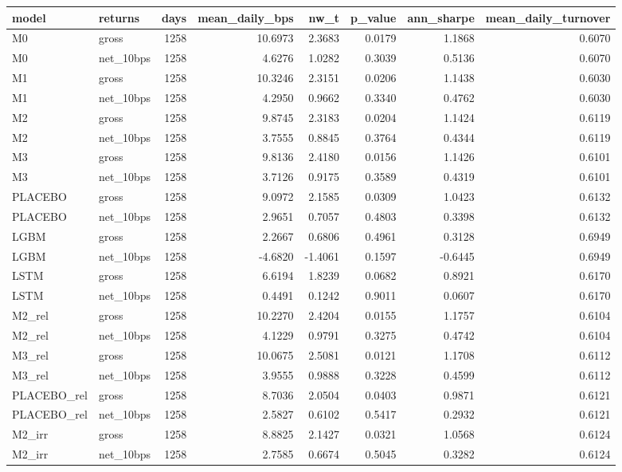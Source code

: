 \begin{tabular}{llrrrrrr}
\toprule
model & returns & days & mean\_daily\_bps & nw\_t & p\_value & ann\_sharpe & mean\_daily\_turnover \\
\midrule
M0 & gross & 1258 & 10.6973 & 2.3683 & 0.0179 & 1.1868 & 0.6070 \\
M0 & net\_10bps & 1258 & 4.6276 & 1.0282 & 0.3039 & 0.5136 & 0.6070 \\
M1 & gross & 1258 & 10.3246 & 2.3151 & 0.0206 & 1.1438 & 0.6030 \\
M1 & net\_10bps & 1258 & 4.2950 & 0.9662 & 0.3340 & 0.4762 & 0.6030 \\
M2 & gross & 1258 & 9.8745 & 2.3183 & 0.0204 & 1.1424 & 0.6119 \\
M2 & net\_10bps & 1258 & 3.7555 & 0.8845 & 0.3764 & 0.4344 & 0.6119 \\
M3 & gross & 1258 & 9.8136 & 2.4180 & 0.0156 & 1.1426 & 0.6101 \\
M3 & net\_10bps & 1258 & 3.7126 & 0.9175 & 0.3589 & 0.4319 & 0.6101 \\
PLACEBO & gross & 1258 & 9.0972 & 2.1585 & 0.0309 & 1.0423 & 0.6132 \\
PLACEBO & net\_10bps & 1258 & 2.9651 & 0.7057 & 0.4803 & 0.3398 & 0.6132 \\
LGBM & gross & 1258 & 2.2667 & 0.6806 & 0.4961 & 0.3128 & 0.6949 \\
LGBM & net\_10bps & 1258 & -4.6820 & -1.4061 & 0.1597 & -0.6445 & 0.6949 \\
LSTM & gross & 1258 & 6.6194 & 1.8239 & 0.0682 & 0.8921 & 0.6170 \\
LSTM & net\_10bps & 1258 & 0.4491 & 0.1242 & 0.9011 & 0.0607 & 0.6170 \\
M2\_rel & gross & 1258 & 10.2270 & 2.4204 & 0.0155 & 1.1757 & 0.6104 \\
M2\_rel & net\_10bps & 1258 & 4.1229 & 0.9791 & 0.3275 & 0.4742 & 0.6104 \\
M3\_rel & gross & 1258 & 10.0675 & 2.5081 & 0.0121 & 1.1708 & 0.6112 \\
M3\_rel & net\_10bps & 1258 & 3.9555 & 0.9888 & 0.3228 & 0.4599 & 0.6112 \\
PLACEBO\_rel & gross & 1258 & 8.7036 & 2.0504 & 0.0403 & 0.9871 & 0.6121 \\
PLACEBO\_rel & net\_10bps & 1258 & 2.5827 & 0.6102 & 0.5417 & 0.2932 & 0.6121 \\
M2\_irr & gross & 1258 & 8.8825 & 2.1427 & 0.0321 & 1.0568 & 0.6124 \\
M2\_irr & net\_10bps & 1258 & 2.7585 & 0.6674 & 0.5045 & 0.3282 & 0.6124 \\

\end{tabular}
